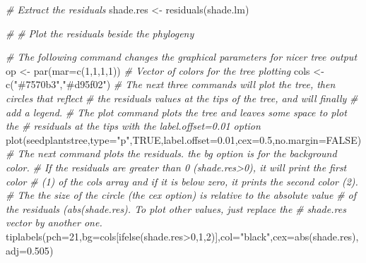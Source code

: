 \documentclass[
]{book}
\newenvironment{Shaded}{\begin{snugshade}}{\end{snugshade}}
\newcommand{\AttributeTok}[1]{\textcolor[rgb]{0.77,0.63,0.00}{#1}}
\newcommand{\CommentTok}[1]{\textcolor[rgb]{0.56,0.35,0.01}{\textit{#1}}}
\newcommand{\ConstantTok}[1]{\textcolor[rgb]{0.00,0.00,0.00}{#1}}
\newcommand{\DecValTok}[1]{\textcolor[rgb]{0.00,0.00,0.81}{#1}}
\newcommand{\FloatTok}[1]{\textcolor[rgb]{0.00,0.00,0.81}{#1}}
\newcommand{\FunctionTok}[1]{\textcolor[rgb]{0.00,0.00,0.00}{#1}}
\newcommand{\NormalTok}[1]{#1}
\newcommand{\OtherTok}[1]{\textcolor[rgb]{0.56,0.35,0.01}{#1}}
\newcommand{\SpecialCharTok}[1]{\textcolor[rgb]{0.00,0.00,0.00}{#1}}
\newcommand{\StringTok}[1]{\textcolor[rgb]{0.31,0.60,0.02}{#1}}
\begin{document}
\begin{Shaded}
\begin{Highlighting}[]
\CommentTok{\# Extract the residuals}
\NormalTok{shade.res }\OtherTok{\textless{}{-}} \FunctionTok{residuals}\NormalTok{(shade.lm)}

\CommentTok{\#}
\CommentTok{\# Plot the residuals beside the phylogeny}

\CommentTok{\# The following command changes the graphical parameters for nicer tree output}
\NormalTok{op }\OtherTok{\textless{}{-}} \FunctionTok{par}\NormalTok{(}\AttributeTok{mar=}\FunctionTok{c}\NormalTok{(}\DecValTok{1}\NormalTok{,}\DecValTok{1}\NormalTok{,}\DecValTok{1}\NormalTok{,}\DecValTok{1}\NormalTok{))}
\CommentTok{\# Vector of colors for the tree plotting}
\NormalTok{cols }\OtherTok{\textless{}{-}} \FunctionTok{c}\NormalTok{(}\StringTok{"\#7570b3"}\NormalTok{,}\StringTok{"\#d95f02"}\NormalTok{)}
\CommentTok{\# The next three commands will plot the tree, then circles that reflect }
\CommentTok{\#  the residuals values at the tips of the tree, and will finally}
\CommentTok{\#  add a legend.}
\CommentTok{\# The plot command plots the tree and leaves some space to plot the }
\CommentTok{\#  residuals at the tips with the \textquotesingle{}label.offset=0.01\textquotesingle{} option}
\FunctionTok{plot}\NormalTok{(seedplantstree,}\AttributeTok{type=}\StringTok{"p"}\NormalTok{,}\ConstantTok{TRUE}\NormalTok{,}\AttributeTok{label.offset=}\FloatTok{0.01}\NormalTok{,}\AttributeTok{cex=}\FloatTok{0.5}\NormalTok{,}\AttributeTok{no.margin=}\ConstantTok{FALSE}\NormalTok{)}
\CommentTok{\# The next command plots the residuals. the \textquotesingle{}bg\textquotesingle{} option is for the background color.}
\CommentTok{\#  If the residuals are greater than 0 (shade.res\textgreater{}0), it will print the first color}
\CommentTok{\#  (1) of the \textquotesingle{}cols\textquotesingle{} array and if it is below zero, it prints the second color (2). }
\CommentTok{\#  The the size of the circle (the \textquotesingle{}cex\textquotesingle{} option) is relative to the absolute value }
\CommentTok{\#  of the residuals (abs(shade.res). To plot other values, just replace the }
\CommentTok{\#  \textquotesingle{}shade.res\textquotesingle{} vector by another one.}
\FunctionTok{tiplabels}\NormalTok{(}\AttributeTok{pch=}\DecValTok{21}\NormalTok{,}\AttributeTok{bg=}\NormalTok{cols[}\FunctionTok{ifelse}\NormalTok{(shade.res}\SpecialCharTok{\textgreater{}}\DecValTok{0}\NormalTok{,}\DecValTok{1}\NormalTok{,}\DecValTok{2}\NormalTok{)],}\AttributeTok{col=}\StringTok{"black"}\NormalTok{,}\AttributeTok{cex=}\FunctionTok{abs}\NormalTok{(shade.res),}\AttributeTok{adj=}\FloatTok{0.505}\NormalTok{)}

\end{Highlighting}
\end{Shaded}
\end{document}
